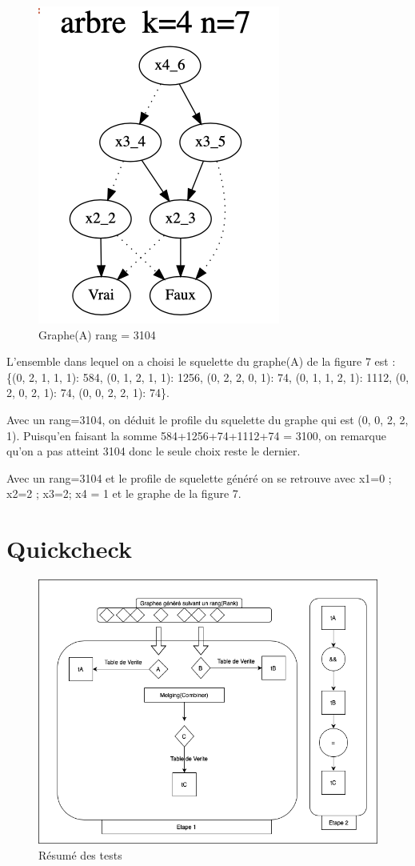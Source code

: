 \documentclass[french]{article}
\begin{document}
\begin{figure}[h!]
    \centering
    \includegraphics[scale=0.4]{arb_3104.png}
    \caption{Graphe(A) rang = 3104}
    \label{fig:graphe_A}
\end{figure}
L'ensemble dans lequel on a choisi le squelette du graphe(A) de la figure 7 est : \{(0, 2, 1, 1, 1): 584, (0, 1, 2, 1, 1): 1256, (0, 2, 2, 0, 1): 74, (0, 1, 1, 2, 1): 1112, (0, 2, 0, 2, 1): 74, (0, 0, 2, 2, 1): 74\}.

Avec un rang=3104, on déduit le profile du squelette du graphe qui est (0, 0, 2, 2, 1). Puisqu'en faisant la somme 584+1256+74+1112+74 = 3100, on remarque qu'on a pas atteint 3104 donc le seule choix reste le dernier.

Avec un rang=3104 et le profile de squelette généré on se retrouve avec {x1=0 ; x2=2  ; x3=2; x4 = 1} et le graphe de la figure 7.

\section{Quickcheck}

\begin{figure}[h!]
    \centering
    \includegraphics[scale=0.3]{generator.png}
    \caption{Résumé des tests}
    \label{fig:Concept}
\end{figure}
\end{document}
